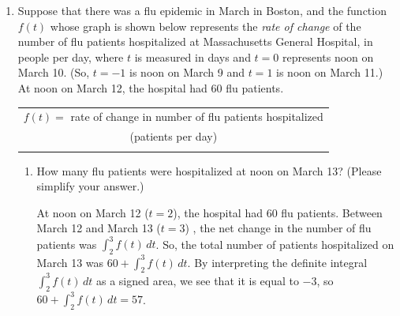 \documentclass{article}
\begin{document}
\begin{enumerate}
\item \label{flu-epidemic}

  
    \newcommand{\graph}{
      \begin{tikzpicture}
        \begin{axis}[gridgraph, xtick={-2, 0, ..., 12}, minor xtick={-1,
            1, ..., 11}, grid=both, minor ytick={-12, -10, ..., 12}, 
          ytick={-12, -8, ..., 12}, width=3.25in, height=2.5in,
          every axis plot/.style={no marks, very thick} ]          
          \addplot+[domain=-2:1] {-6*x-6};
          \addplot+[domain=1:5] {6*(x-1)-12};
          \addplot+[domain=5:7] {12};
          \addplot+[domain=7:12] {-3*(x-11)};
        \end{axis}
      \end{tikzpicture}
    }

    Suppose that there was a flu epidemic in March in Boston, and the
    function $f(t)$ whose graph is shown below represents the \emph{rate of
      change} of the number of flu patients hospitalized at Massachusetts
    General Hospital, in people per day, where $t$ is measured in days and
    $t = 0$ represents noon on March 10.  (So, $t = -1$ is noon on March 9
    and $t = 1$ is noon on March 11.)  At noon on March 12, the hospital had
    60 flu patients.

    \begin{tabular}{c}
      {\small $f(t) = $ rate of change in number of flu patients hospitalized} \\
      {\small (patients per day)} \\
      \graph
    \end{tabular}
    \begin{enumerate}
    \item \label{flu-epidemic-calculate-example} 
      \begin{problem}[\vfill]
        How many flu patients were hospitalized at noon on March 13?
        (Please simplify your answer.)
      \end{problem}

      \begin{solution}
        At noon on March 12 ($t = 2$), the hospital had 60 flu patients.
        Between March 12 and March 13 ($t = 3$) , the net change in the
        number of flu patients was $\displaystyle \int_2^3 f(t)\,dt$.  So,
        the total number of patients hospitalized on March 13 was $60 +
        \displaystyle \int_2^3 f(t)\,dt$.  By interpreting the definite
        integral $\displaystyle \int_2^3 f(t)\,dt$ as a signed area, we see
        that it is equal to $-3$, so $60 + \displaystyle \int_2^3 f(t)\,dt =
        \boxed{57}$.
      \end{solution}


\end{enumerate}
\end{enumerate}
\end{document}
